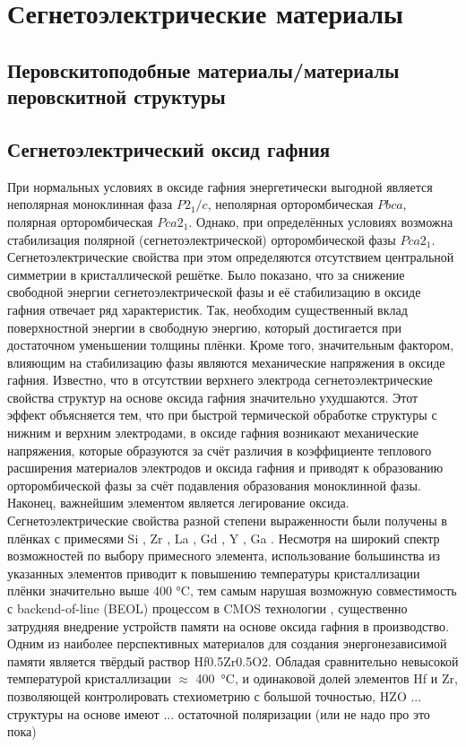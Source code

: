 \chapter{Сегнетоэлектрические материалы}\label{ch:ch1}
\section{Перовскитоподобные материалы/материалы перовскитной структуры}

\section{Сегнетоэлектрический оксид гафния}\label{sec:ch1/sec1}
При нормальных условиях в оксиде гафния энергетически выгодной является неполярная моноклинная фаза \(P2_1/c\), неполярная орторомбическая \(Pbca\), полярная орторомбическая \(Pca2_1\). Однако, при определённых условиях возможна стабилизация полярной (сегнетоэлектрической) орторомбической фазы \(Pca2_1\). Сегнетоэлектрические свойства при этом определяются отсутствием центральной симметрии в кристаллической решётке.
Было показано, что за снижение свободной энергии сегнетоэлектрической фазы и её стабилизацию в оксиде гафния отвечает ряд характеристик. Так, необходим существенный вклад поверхностной энергии в свободную энергию, который достигается при достаточном уменьшении толщины плёнки. Кроме того, значительным фактором, влияющим на стабилизацию фазы являются механические напряжения в оксиде гафния. Известно, что в отсутствии верхнего электрода сегнетоэлектрические свойства структур на основе оксида гафния значительно ухудшаются. Этот эффект объясняется тем, что при быстрой термической обработке структуры с нижним и верхним электродами, в оксиде гафния возникают механические напряжения, которые образуются за счёт различия в коэффициенте теплового расширения материалов электродов и оксида гафния и приводят к образованию орторомбической фазы за счёт подавления образования моноклинной фазы. Наконец, важнейшим элементом является легирование оксида. Сегнетоэлектрические свойства разной степени выраженности были получены в плёнках с примесями Si \cite{}, Zr \cite{}, La \cite{}, Gd \cite{}, Y \cite{}, Ga \cite{chouprikNanoscaleDopingIts2022}. Несмотря на широкий спектр возможностей по выбору примесного элемента, использование большинства из указанных элементов приводит к повышению температуры кристаллизации плёнки значительно выше 400 \si{\degreeCelsius}, тем самым нарушая возможную совместимость с backend-of-line (BEOL) процессом в CMOS технологии \cite{schmitzLowTemperatureThin2018}, существенно затрудняя внедрение устройств памяти на основе оксида гафния в производство. Одним из наиболее перспективных материалов для создания энергонезависимой памяти является твёрдый раствор Hf0.5Zr0.5O2. Обладая сравнительно невысокой температурой кристаллизации \(\approx\) \SI{400}{\degreeCelsius}, и одинаковой долей элементов Hf и Zr, позволяющей контролировать стехиометрию с большой точностью, HZO ... структуры на основе имеют ... остаточной поляризации (или не надо про это пока)
